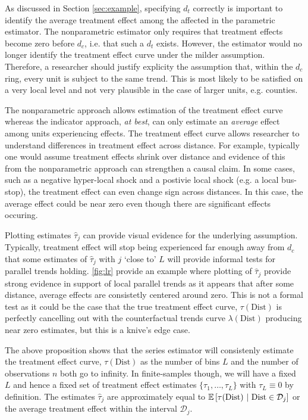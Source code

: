 \documentclass[10pt]{article}
\newcommand{\dist}{\text{Dist}}
\begin{document}
As discussed in Section \ref{sec:example}, specifying $d_t$ correctly is important to identify the average treatment effect among the affected in the parametric estimator. The nonparametric estimator only requires that treatment effects become zero before $d_c$, i.e. that such a $d_t$ exists. However, the estimator would no longer identify the treatment effect curve under the milder  assumption. Therefore, a researcher should justify explicity the assumption that, within the $d_c$ ring, every unit is subject to the same trend. This is most likely to be satisfied on a very local level and not very plausible in the case of larger units, e.g. counties.

The nonparametric approach allows estimation of the treatment effect curve whereas the indicator approach, \emph{at best}, can only estimate an \emph{average} effect among units experiencing effects. The treatment effect curve allows researcher to understand differences in treatment effect across distance. For example, typically one would assume treatment effects shrink over distance and evidence of this from the nonparametric approach can strengthen a causal claim. In some cases, such as a negative hyper-local shock and a postivie local shock (e.g. a local bus-stop), the treatment effect can even change sign across distances. In this case, the average effect could be near zero even though there are significant effects occuring. 

Plotting estimates $\hat{\tau}_j$ can provide visual evidence for the underlying  assumption. Typically, treatment effect will stop being experienced far enough away from $d_c$ that some estimates of $\hat{\tau}_j$ with $j$ `close to' $L$ will provide informal tests for parallel trends holding. \autoref{fig:lr} provide an example where plotting of $\hat{\tau}_j$ provide strong evidence in support of local parallel trends as it appears that after some distance, average effects are consistetly centered around zero. This is not a formal test as it could be the case that the true treatment effect curve, $\tau(\dist)$ is perfectly cancelling out with the counterfactual trends curve $\lambda(\dist)$ producing near zero estimates, but this is a knive's edge case. 

The above proposition shows that the series estimator will consistenly estimate the treatment effect curve, $\tau(\dist)$ as the number of bins $L$ and the number of observations $n$ both go to infinity. In finite-samples though, we will have a fixed $L$ and hence a fixed set of treatment effect estimates $\{ \tau_1, \dots, \tau_{L}\}$ with $\tau_L \equiv 0$ by definition. The estimates $\hat{\tau}_j$ are approximately equal to $\condexpec{\tau(\dist)}{\dist \in \mathcal{D}_j}$ or the average treatment effect within the interval $\mathcal{D}_j$.
\end{document}
